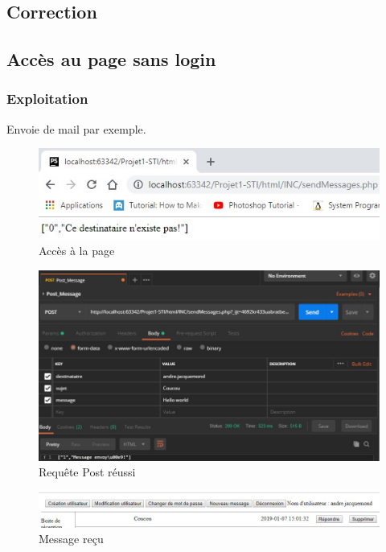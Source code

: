 \documentclass[12pt]{article}
\begin{document}
\subsection{Correction}


\subsection{Accès au page sans login}
\subsubsection{Exploitation}
Envoie de mail par exemple.
\begin{figure}[H]
\centering
\includegraphics{images/withoutLogin.jpg}
\caption{Accès à la page}
\end{figure}
\begin{figure}[H]
\centering
\includegraphics[width=\linewidth]{images/postmanSendMessage.jpg}
\caption{Requête Post réussi}
\end{figure}
\begin{figure}[H]
\centering
\includegraphics{images/postmanSendMessageSuccess.jpg}
\caption{Message reçu}
\end{figure}
\end{document}
